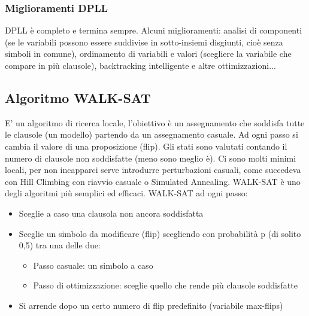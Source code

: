 \documentclass{article}
\begin{document}
\subsubsection{Miglioramenti DPLL}
DPLL è completo e termina sempre. Alcuni miglioramenti: analisi di componenti (se le variabili possono essere suddivise in sotto-insiemi disgiunti, cioè senza simboli in comune), ordinamento di variabili e valori (scegliere la variabile che compare in più clausole), backtracking intelligente e altre ottimizzazioni...

\subsection{Algoritmo WALK-SAT}
E' un algoritmo di ricerca locale, l'obiettivo è un assegnamento che soddisfa tutte le clausole (un modello) partendo da un assegnamento casuale. Ad ogni passo si cambia il valore di una proposizione (flip). Gli stati sono valutati contando il numero di clausole non soddisfatte (meno sono meglio è). Ci sono molti minimi locali, per non incapparci serve introdurre perturbazioni casuali, come succedeva con Hill Climbing con riavvio casuale o Simulated Annealing. WALK-SAT è uno degli algoritmi più semplici ed efficaci. \clearpage
WALK-SAT ad ogni passo: 
\begin{itemize}
    \item Sceglie a caso una clausola non ancora soddisfatta
    \item Sceglie un simbolo da modificare (flip) scegliendo con probabilità p (di solito 0,5) tra una delle due: \begin{itemize}
        \item Passo casuale: un simbolo a caso
        \item Passo di ottimizzazione: sceglie quello che rende più clausole soddisfatte
    \end{itemize}
    \item Si arrende dopo un certo numero di flip predefinito (variabile max-flips)
\end{itemize}
\end{document}
